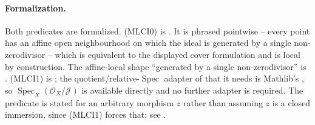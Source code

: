 \begin{definition}
  \paragraph{Formalization.}
  Both predicates are formalized.  (MLCI0) is
  \texttt{}.  It is
  phrased pointwise -- every point has an affine open neighbourhood on which the ideal
  is generated by a single non-zerodivisor -- which is equivalent to the displayed
  cover formulation and is local by construction.  The affine-local shape
  ``generated by a single non-zerodivisor'' is
  \texttt{}.  (MLCI1) is
  \texttt{}; the
  quotient/relative-$\operatorname{Spec}$ adapter of
   that it needs is Mathlib's
  \texttt{}, so
  $\operatorname{Spec}_X(\mathcal O_X/\mathcal J)$ is available directly and no
  further adapter is required.  The predicate is stated for an arbitrary morphism $z$
  rather than assuming $z$ is a closed immersion, since (MLCI1) forces that; see
  \texttt{}.
\end{definition}

